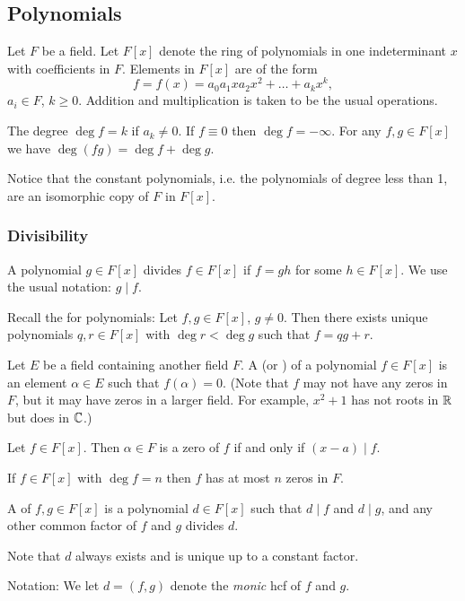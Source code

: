 \subsection{Polynomials}
Let $F$ be a field. Let $F[x]$ denote the ring of polynomials in one indeterminant $x$ with coefficients in $F$. Elements in $F[x]$ are of the form
\[
	f = f(x) = a_0 a_1 x a_2 x^2 + \dots + a_k x^k,
\]
$a_i \in F$, $k \geq 0$. Addition and multiplication is taken to be the usual operations.

The degree $\deg{f} = k$ if $a_k \neq 0$. If $f \equiv 0$ then $\deg{f} = -\infty$. For any $f, g \in F[x]$ we have $\deg(fg) = \deg{f} + \deg{g}$.

Notice that the constant polynomials, i.e. the polynomials of degree less than 1, are an isomorphic copy of $F$ in $F[x]$.

\subsubsection{Divisibility}
A polynomial $g \in F[x]$ divides $f \in F[x]$ if $f = gh$ for some $h \in F[x]$. We use the usual notation: $g \mid f$.

Recall the  for polynomials: Let $f, g \in F[x]$, $g \neq 0$. Then there exists unique polynomials $q, r \in F[x]$ with $\deg{r} < \deg{g}$ such that $f = qg + r$.

Let $E$ be a field containing another field $F$. A  (or ) of a polynomial $f \in F[x]$ is an element $\alpha \in E$ such that $f(\alpha) = 0$. (Note that $f$ may not have any zeros in $F$, but it may have zeros in a larger field. For example, $x^2 + 1$ has not roots in $\mathbb{R}$ but does in $\mathbb{C}$.)

\begin{corollary}
	Let $f \in F[x]$. Then $\alpha \in F$ is a zero of $f$ if and only if $(x - a) \mid f$.
\end{corollary}

\begin{corollary}
	If $f \in F[x]$ with $\deg{f} = n$ then $f$ has at most $n$ zeros in $F$.
\end{corollary}

\begin{definition}
	A  of $f, g \in F[x]$ is a polynomial $d \in F[x]$ such that $d \mid f$ and $d \mid g$, and any other common factor of $f$ and $g$ divides $d$.
	
	Note that $d$ always exists and is unique up to a constant factor.
	
	Notation: We let $d = (f, g)$ denote the \emph{monic} hcf of $f$ and $g$.
\end{definition}


